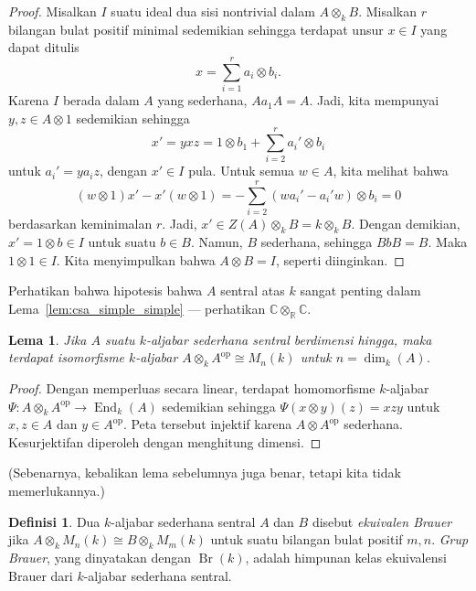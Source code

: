 \documentclass[12pt]{article}
\theoremstyle{plain}
\newtheorem{lemma}[theorem]{Lema}
\theoremstyle{definition}
\newtheorem{definition}[theorem]{Definisi}
\theoremstyle{remark}
\numberwithin{equation}{section}
\begin{document}
\begin{proof}
Misalkan $I$ suatu ideal dua sisi nontrivial dalam $A \otimes_k B$.
Misalkan $r$ bilangan bulat positif minimal sedemikian sehingga
terdapat unsur $x \in I$ yang dapat ditulis
\[
x = \sum_{i=1}^r a_i \otimes b_i.
\]
Karena $I$ berada dalam $A$ yang sederhana, $Aa_1A=A$. Jadi, kita mempunyai $y,z \in A \otimes 1$
sedemikian sehingga
\[
x'=yxz = 1 \otimes b_1 + \sum_{i=2}^r a_i' \otimes b_i
\]
untuk $a_i'=ya_iz$, dengan $x' \in I$ pula.
Untuk semua $w \in A$, kita melihat bahwa
\[
(w \otimes 1)x' - x'(w \otimes 1) = -\sum_{i=2}^r (wa_i'-a_i'w) \otimes
b_i = 0
\]
berdasarkan keminimalan $r$. Jadi, $x' \in Z(A) \otimes_k B = k \otimes_k B$.
Dengan demikian, $x'=1 \otimes b \in I$ untuk suatu $b \in B$.
Namun, $B$ sederhana, sehingga $BbB=B$. Maka $1 \otimes 1 \in I$.
Kita menyimpulkan bahwa $A \otimes B = I$, seperti diinginkan.
\end{proof}

Perhatikan bahwa hipotesis bahwa $A$ sentral atas $k$ sangat penting
dalam Lema~\ref{lem:csa_simple_simple} --- perhatikan $\mathbb{C}
\otimes_{\mathbb{R}} \mathbb{C}$.

\begin{lemma}
Jika $A$ suatu $k$-aljabar sederhana sentral berdimensi hingga,
maka terdapat isomorfisme $k$-aljabar
$A \otimes_k A^{\mathrm{op}} \cong M_n(k)$
untuk $n = \dim_k(A)$.
\end{lemma}

\begin{proof}
Dengan memperluas secara linear, terdapat homomorfisme $k$-aljabar
$\Psi : A \otimes_k A^{\mathrm{op}} \to \operatorname{End}_k(A)$
sedemikian sehingga $\Psi(x \otimes y)(z)=xzy$ untuk $x,z \in A$ dan
$y \in A^{\mathrm{op}}$. Peta tersebut injektif karena
$A \otimes A^{\mathrm{op}}$ sederhana.
Kesurjektifan diperoleh dengan menghitung dimensi.
\end{proof}

(Sebenarnya, kebalikan lema sebelumnya juga benar, tetapi kita tidak
memerlukannya.)

\begin{definition}
Dua $k$-aljabar sederhana sentral $A$ dan $B$ disebut
\emph{ekuivalen Brauer} jika $A \otimes_k M_n(k) \cong B \otimes_k
M_m(k)$ untuk suatu bilangan bulat positif $m,n$.
\emph{Grup Brauer}, yang dinyatakan dengan $\operatorname{Br}(k)$,
adalah himpunan kelas ekuivalensi Brauer
dari $k$-aljabar sederhana sentral.
\end{definition}
\end{document}

